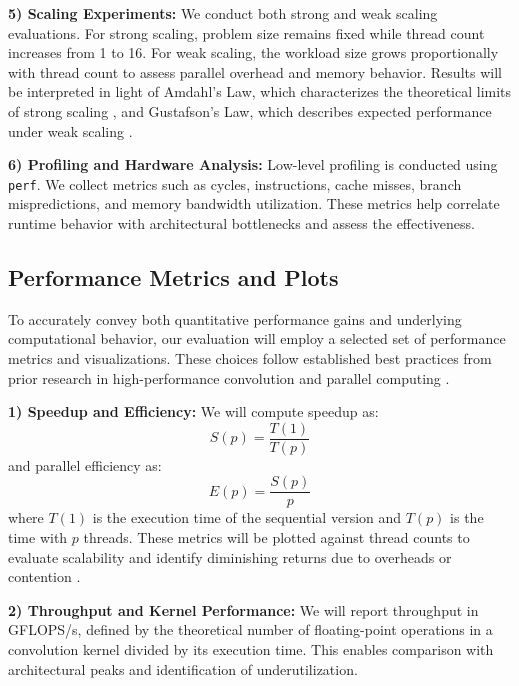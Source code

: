 \documentclass[conference, 10pt]{IEEEtran}
\begin{document}
\vspace{0.5em}
\textbf{5) Scaling Experiments:} 
We conduct both strong and weak scaling evaluations. For strong scaling, problem size remains fixed while thread count increases from 1 to 16. For weak scaling, the workload size grows proportionally with thread count to assess parallel overhead and memory behavior. Results will be interpreted in light of Amdahl’s Law, which characterizes the theoretical limits of strong scaling \cite{hager2021hpc}, and Gustafson’s Law, which describes expected performance under weak scaling \cite{Gustafson1988}.


\vspace{0.5em}
\textbf{6) Profiling and Hardware Analysis:} Low-level profiling is conducted using \texttt{perf}. We collect metrics such as cycles, instructions, cache misses, branch mispredictions, and memory bandwidth utilization. These metrics help correlate runtime behavior with architectural bottlenecks and assess the effectiveness.


\subsection{\textbf{Performance Metrics and Plots}}

To accurately convey both quantitative performance gains and underlying computational behavior, our evaluation will employ a selected set of performance metrics and visualizations. These choices follow established best practices from prior research in high-performance convolution and parallel computing \cite{Wang2023,  hager2021hpc, Rajput2013, Yoon2012}.

\vspace{0.5em}
\textbf{1) Speedup and Efficiency:} 
We will compute speedup as:
\begin{equation}
    S(p) = \frac{T(1)}{T(p)}
\end{equation}
and parallel efficiency as:
\begin{equation}
    E(p) = \frac{S(p)}{p}
\end{equation}
where \(T(1)\) is the execution time of the sequential version and \(T(p)\) is the time with \(p\) threads. These metrics will be plotted against thread counts to evaluate scalability and identify diminishing returns due to overheads or contention \cite{Rajput2013}.

\vspace{0.5em}
\textbf{2) Throughput and Kernel Performance:} 
We will report throughput in GFLOPS/s, defined by the theoretical number of floating-point operations in a convolution kernel divided by its execution time. This enables comparison with architectural peaks and identification of underutilization.
\end{document}
